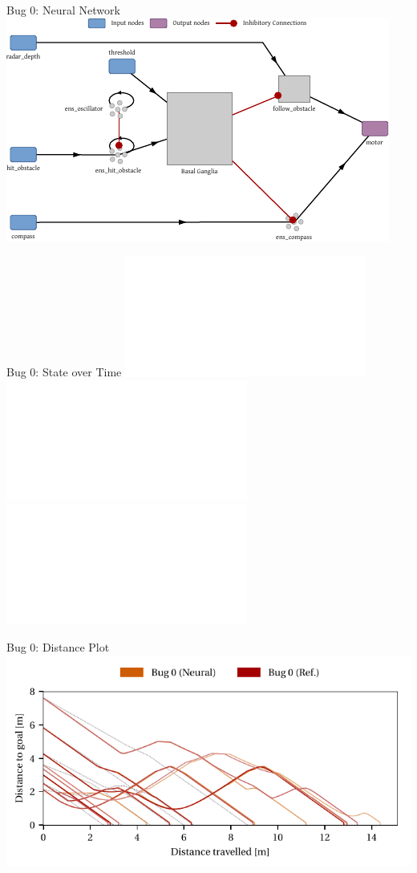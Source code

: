 \documentclass[aspectratio=169]{beamer}
\begin{document}
\begin{frame}{Bug 0: Neural Network}
	\centering
	\includegraphics[height=0.775\textheight]{media/nengo_bug_0_network.pdf}
\end{frame}


\begin{frame}{Bug 0: State over Time}
	\centering
	\includegraphics<1>[height=0.85\textheight]{media/sim_1_traj_map_04_bug_0_neural_bug_0_ref.pdf}
	\includegraphics<2>{media/sim_1_trace_map_04_Bug_0_ref.pdf}
	\includegraphics<3>{media/sim_1_trace_map_04_Bug_0_neural.pdf}
\end{frame}

\begin{frame}{Bug 0: Distance Plot}
	\centering
	\includegraphics{media/vis_dist_map_04_bug_0_neural_bug_0_ref.pdf}
\end{frame}
\end{document}
